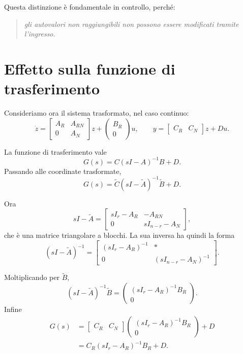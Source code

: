 Questa distinzione è fondamentale in controllo, perché:
\begin{quote}
\emph{gli autovalori non raggiungibili non possono essere modificati tramite l’ingresso.}
\end{quote}

\section{Effetto sulla funzione di trasferimento}

Consideriamo ora il sistema trasformato, nel caso continuo:
\[
\dot z=
\begin{bmatrix}
A_R & A_{RN}\\
0 & A_N
\end{bmatrix}z+
\begin{pmatrix}
B_R\\
0
\end{pmatrix}u,
\qquad
y=
\begin{bmatrix}
C_R & C_N
\end{bmatrix}z+Du.
\]

La funzione di trasferimento vale
\[
G(s)=C(sI-A)^{-1}B+D.
\]
Passando alle coordinate trasformate,
\[
G(s)=\tilde C(sI-\tilde A)^{-1}\tilde B + D.
\]

Ora
\[
sI-\tilde A=
\begin{bmatrix}
sI_r-A_R & -A_{RN}\\
0 & sI_{n-r}-A_N
\end{bmatrix},
\]
che è una matrice triangolare a blocchi. La sua inversa ha quindi la forma
\[
(sI-\tilde A)^{-1}=
\begin{bmatrix}
(sI_r-A_R)^{-1} & *\\
0 & (sI_{n-r}-A_N)^{-1}
\end{bmatrix}.
\]

Moltiplicando per \(\tilde B\),
\[
(sI-\tilde A)^{-1}\tilde B=
\begin{pmatrix}
(sI_r-A_R)^{-1}B_R\\
0
\end{pmatrix}.
\]
Infine
\begin{align}
G(s)
&=
\begin{bmatrix}
C_R & C_N
\end{bmatrix}
\begin{pmatrix}
(sI_r-A_R)^{-1}B_R\\
0
\end{pmatrix}+D\\
&=
C_R(sI_r-A_R)^{-1}B_R+D.
\end{align}

